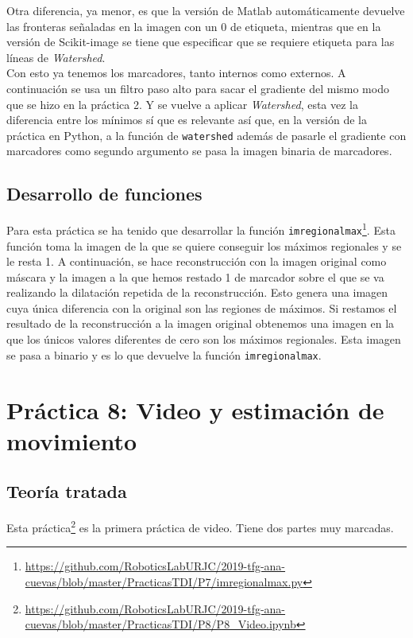  Otra diferencia, ya menor, es que la versión de Matlab automáticamente devuelve las fronteras señaladas en la imagen con un 0 de etiqueta, mientras que en la versión de Scikit-image se tiene que especificar que se requiere etiqueta para las líneas de \emph{Watershed}.\\

Con esto ya tenemos los marcadores, tanto internos como externos. A continuación se usa un filtro paso alto para sacar el gradiente del mismo modo que se hizo en la práctica 2. Y se vuelve a aplicar  \emph{Watershed}, esta vez la diferencia entre los mínimos sí que es relevante así que, en la versión de la práctica en Python, a la función de \texttt{watershed} además de pasarle el gradiente con marcadores como segundo argumento se pasa la imagen binaria de marcadores.\\


\subsection{Desarrollo de funciones}

Para esta práctica se ha tenido que desarrollar la función \texttt{imregionalmax}\footnote{\url{https://github.com/RoboticsLabURJC/2019-tfg-ana-cuevas/blob/master/PracticasTDI/P7/imregionalmax.py}}. Esta función toma la imagen de la que se quiere conseguir los máximos regionales y se le resta 1. A continuación, se hace reconstrucción con la imagen original como máscara y la imagen a la que hemos restado 1 de marcador sobre el que se va realizando la dilatación repetida de la reconstrucción. Esto genera una imagen cuya única diferencia con la original son las regiones de máximos. Si restamos el resultado de la reconstrucción a la imagen original obtenemos una imagen en la que los únicos valores diferentes de cero son los máximos regionales. Esta imagen se pasa a binario y es lo que devuelve la función \texttt{imregionalmax}.


\section{Práctica 8: Video y estimación de movimiento}
\subsection{Teoría tratada}

Esta práctica\footnote{\url{https://github.com/RoboticsLabURJC/2019-tfg-ana-cuevas/blob/master/PracticasTDI/P8/P8_Video.ipynb}} es la primera práctica de video. Tiene dos partes muy marcadas.\\

